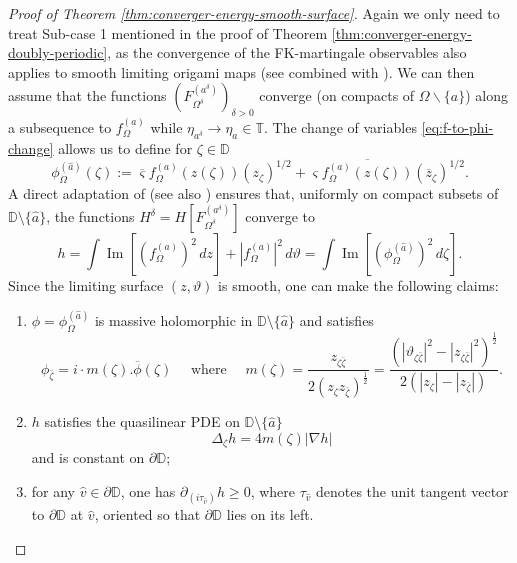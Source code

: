 \documentclass[reqno]{amsart}
\numberwithin{equation}{section}
\theoremstyle{definition}
\theoremstyle{remark}
\renewcommand\Im{\operatorname{Im}}
\begin{document}
\begin{proof}[Proof of Theorem \ref{thm:converger-energy-smooth-surface}]
Again we only need to treat Sub-case 1 mentioned in the proof of Theorem \ref{thm:converger-energy-doubly-periodic}, as the convergence of the FK-martingale observables \cite{Par25} also applies to smooth limiting origami maps (see \cite[Remark 1.4]{Par25} combined with \cite[Proposition 5.8]{park-iso}). We can then assume that the functions $(F^{(a^\delta)}_{\Omega^\delta})_{\delta >0}$ converge (on compacts of $\Omega \backslash \{ a\}$) along a subsequence to $f^{(a)}_\Omega$ while $\eta_{a^\delta} \to \eta_a \in \mathbb{T}$. The change of variables \eqref{eq:f-to-phi-change} allows us to define for $\zeta\in \mathbb{D}$ 
\begin{equation*}
	\phi^{(\hat{a})}_\Omega (\zeta) := \overline{\varsigma} f^{(a)}_\Omega(z(\zeta)) (z_\zeta)^{1/2} + \varsigma \overline{f^{(a)}_\Omega(z(\zeta))} (\overline{z}_\zeta)^{1/2}.
\end{equation*}
A direct adaptation of \cite[Proposition~2.21]{CLR2} (see also \cite[Chapter 6]{MahPHD}) ensures that, uniformly on compact subsets of $\mathbb{D} \setminus \{\hat{a}\}$, the functions $H^\delta = H[F^{(a^\delta)}_{\Omega^\delta}]$ converge to
\begin{equation}
h = \int \Im[(f^{(a)}_\Omega)^2\,dz] + |f^{(a)}_\Omega|^2\,d\vartheta = \int \Im[(\phi^{(\hat{a})}_\Omega)^2\,d\zeta].
\end{equation}
Since the limiting surface $(z,\vartheta)$ is smooth, one can make the following claims: 
\begin{enumerate}
	\item $\phi=\phi^{(\hat{a})}_\Omega$ is massive holomorphic in $\mathbb{D} \setminus \{\hat{a}\}$ and satisfies 
	\begin{equation*}
	\phi_{\bar{\zeta}}=i\cdot m(\zeta).\overline{\phi}(\zeta) \quad \textrm{ where } \quad m(\zeta)=\frac{z_{\zeta \bar{\zeta}}}{2(z_\zeta z_{\bar{\zeta}})^\frac{1}{2}}= \frac{(|\vartheta_{\zeta \bar{\zeta}} |^2-|z_{\zeta \bar{\zeta}}|^2)^{\frac12}}{2(|z_\zeta|-|z_{\bar{\zeta}}|)}.
\end{equation*}
	\item $h$ satisfies the quasilinear PDE on $\mathbb{D} \setminus \{\hat{a}\}$
\begin{equation*}
	\Delta_{\zeta} h = 4m(\zeta)|\nabla h |
\end{equation*}
  and is constant on $\partial \mathbb{D}$;
	\item for any $\hat{v} \in \partial \mathbb{D}$, one has $\partial_{(i\tau_{\hat{v}})}h \geq 0$, where $\tau_{\hat{v}}$ denotes the unit tangent vector to $\partial \mathbb{D}$ at $\hat{v}$, oriented so that $\partial \mathbb{D}$ lies on its left.
\end{enumerate}


\end{proof}
\end{document}
